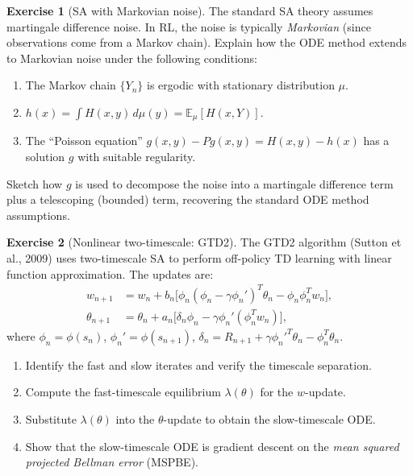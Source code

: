\documentclass[11pt,a4paper]{article}
\theoremstyle{definition}
\newtheorem{exercise}{Exercise}[section]
\theoremstyle{plain}
\theoremstyle{remark}
\newcommand{\E}{\mathbb{E}}
\begin{document}
\begin{exercise}[SA with Markovian noise]
\label{ex:markov-noise}
The standard SA theory assumes martingale difference noise. In RL, the noise is
typically \emph{Markovian} (since observations come from a Markov chain). Explain how
the ODE method extends to Markovian noise under the following conditions:
\begin{enumerate}[label=(\alph*)]
\item The Markov chain $\{Y_n\}$ is ergodic with stationary distribution $\mu$.
\item $h(x) = \int H(x, y) \, d\mu(y) = \E_\mu[H(x, Y)]$.
\item The ``Poisson equation'' $g(x, y) - Pg(x, y) = H(x, y) - h(x)$ has a
  solution $g$ with suitable regularity.
\end{enumerate}
Sketch how $g$ is used to decompose the noise into a martingale difference term plus
a telescoping (bounded) term, recovering the standard ODE method assumptions.
\end{exercise}

\begin{exercise}[Nonlinear two-timescale: GTD2]
\label{ex:gtd2}
The GTD2 algorithm (Sutton et al., 2009) uses two-timescale SA to perform off-policy
TD learning with linear function approximation. The updates are:
\begin{align*}
  w_{n+1} &= w_n + b_n \bigl[\phi_n(\phi_n - \gamma \phi_n')^T \theta_n - \phi_n \phi_n^T w_n\bigr], \\
  \theta_{n+1} &= \theta_n + a_n \bigl[\delta_n \phi_n - \gamma \phi_n' (\phi_n^T w_n)\bigr],
\end{align*}
where $\phi_n = \phi(s_n)$, $\phi_n' = \phi(s_{n+1})$, $\delta_n = R_{n+1} + \gamma \phi_n'^T \theta_n - \phi_n^T \theta_n$.
\begin{enumerate}[label=(\alph*)]
\item Identify the fast and slow iterates and verify the timescale separation.
\item Compute the fast-timescale equilibrium $\lambda(\theta)$ for the $w$-update.
\item Substitute $\lambda(\theta)$ into the $\theta$-update to obtain the
  slow-timescale ODE.
\item Show that the slow-timescale ODE is gradient descent on the \emph{mean squared
  projected Bellman error} (MSPBE).
\end{enumerate}
\end{exercise}
\end{document}

